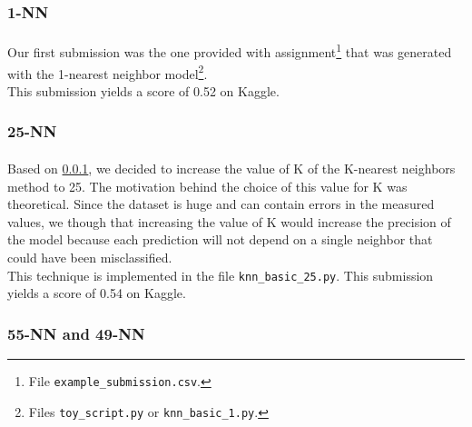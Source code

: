 \documentclass[a4paper, 11pt, oneside]{article}
\begin{document}
\subsubsection{1-NN} \label{1NN}
\paragraph{}Our first submission was the one provided with assignment\footnote{File \texttt{example\_submission.csv}.} that was generated with the 1-nearest neighbor model\footnote{Files \texttt{toy\_script.py} or \texttt{knn\_basic\_1.py}.}.\\
This submission yields a score of 0.52 on Kaggle.

\subsubsection{25-NN}
\paragraph{}Based on \ref{1NN}, we decided to increase the value of K of the K-nearest neighbors method to 25. The motivation behind the choice of this value for K was theoretical. Since the dataset is huge and can contain errors in the measured values, we though that increasing the value of K would increase the precision of the model because each prediction will not depend on a single neighbor that could have been misclassified.\\
This technique is implemented in the file \texttt{knn\_basic\_25.py}. This submission yields a score of 0.54 on Kaggle.

\subsubsection{55-NN and 49-NN}
\end{document}
